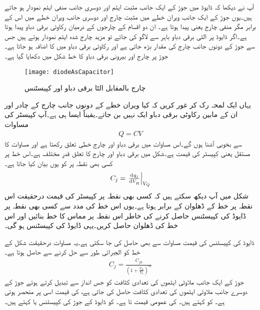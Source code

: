 آپ نے دیکھا کہ  ڈایوڈ میں جوڑ کے ایک جانب مثبت ایٹم اور دوسری جانب منفی ایٹم نمودار ہو جاتے ہیں۔یوں جوڑ کے ایک جانب ویران خطے میں مثبت چارج  اور دوسری جانب ویران خطے میں اس کے برابر مگر منفی چارج یعنی  پیدا ہوتا ہے۔ ان دو اقسام کے چارجوں کے درمیان رکاوٹی برقی دباو  پیدا ہوتا ہے۔اگر  ڈایوڈ پر الٹی برقی دباو   باہر سے لاگو کی جائے تو مزید چارج شدہ ایٹم نمودار ہوتے ہیں جس سے جوڑ کے دونوں جانب چارج کی مقدار بڑھ جاتی ہے اور رکاوٹی برقی دباو میں  کا اضافہ ہو جاتا ہے۔جوڑ پر چارج  اور بیرونی برقی دباو   کا خط شکل   میں دکھایا گیا ہے۔
\begin{figure}
\centering
\texttt{[image: diodeAsCapacitor]}
\caption{چارج بالمقابل الٹا برقی دباو اور کپیسٹنس}
\label{شکل_ڈایوڈ_بطور_کپیسٹر}
\end{figure}
یہاں ایک لمحہ رک کر غور کریں کہ کیا ویران خطے کے دونوں جانب چارج کے چادر اور ان کے مابین رکاوٹی برقی دباو ایک  نہیں بن جاتے۔یقیناً ایسا ہی ہے۔آپ کپیسٹر کی مساوات
\begin{align}
Q=C V
\end{align}
سے بخوبی آشنا ہوں گے۔اس مساوات میں برقی دباو اور چارج خطی تعلق رکھتا ہے اور مساوات کا مستقل یعنی  کپیسٹر کی قیمت ہے۔شکل   میں برقی دباو اور چارج کا تعلق قدرِ مختلف ہے۔اس خط پر کسی بھی نقطہ پر  کو یوں بیان کیا جاتا ہے۔
\begin{align}
C_j = \left . \od{q_j}{V_R} \right |_{V_Q}
\end{align}
شکل میں آپ دیکھ سکتے ہیں کہ کسی بھی نقطہ پر کپیسٹر کی قیمت درحقیقت اس نقطہ پر خط کے ڈھلوان کے برابر ہوتا ہے۔یوں اس خط کی مدد سے کسی بھی نقطہ پر ڈایوڈ کی کپیسٹنس حاصل کرنے کی خاطر اس نقطہ پر مماس کا خط بنائیں اور اس خط کی ڈھلوان حاصل کریں۔یہی ڈایوڈ کی کپیسٹنس ہو گی۔

ڈایوڈ کی کپیسٹنس  کی قیمت  مساوات   سے بھی حاصل کی جا سکتی ہے۔یہ مساوات درحقیقت شکل   کے خط کو الجبرائی طور سے حل کرنے سے حاصل ہوتا ہے۔
\begin{align} \label{مساوات_ڈایوڈ_کپیسٹنس}
C_j = \frac{C_{j0}}{\left(1+\frac{V_R}{V_0} \right )^m}
\end{align}
جوڑ کے ایک جانب   ملاوٹی ایٹموں کی تعدادی کثافت کو جس انداز سے تبدیل کرتے ہوئے جوڑ کے دوسرے جانب  ملاوٹی ایٹموں کی تعدادی کثافت حاصل کی جاتی ہے،  کی قیمت اسی پر منحصر ہوتی ہے۔ کو  کہتے ہیں۔  کی عمومی قیمت  تا  ہے۔  کو ڈایوڈ کے جوڑ کی کپیسٹنس یا   کہتے ہیں۔


